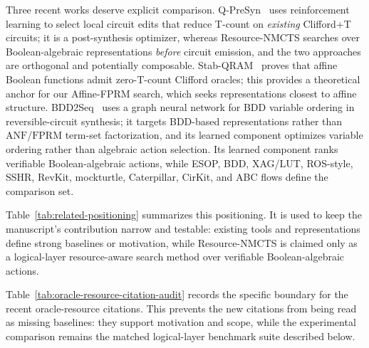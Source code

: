 \documentclass[11pt]{article}
\newcommand{\method}{Resource-NMCTS}
\newcommand{\anf}{\ensuremath{\mathrm{ANF}}}
\newcommand{\fprm}{\ensuremath{\mathrm{FPRM}}}
\newcommand{\mcts}{\ensuremath{\mathrm{MCTS}}}
\begin{document}
Three recent works deserve explicit comparison.  Q-PreSyn~\cite{qpresyn2026}
uses reinforcement learning to select local circuit edits that reduce T-count
on \emph{existing} Clifford+T circuits; it is a post-synthesis optimizer,
whereas \method{} searches over Boolean-algebraic representations
\emph{before} circuit emission, and the two approaches are orthogonal and
potentially composable.  Stab-QRAM~\cite{stabqram2025} proves that affine
Boolean functions admit zero-T-count Clifford oracles; this provides a
theoretical anchor for our Affine-FPRM search, which seeks representations
closest to affine structure.  BDD2Seq~\cite{bdd2seq2025} uses a graph neural
network for BDD variable ordering in reversible-circuit synthesis; it targets
BDD-based representations rather than \anf{}/\fprm{} term-set factorization,
and its learned component optimizes variable ordering rather than algebraic
action selection.  Its
learned component ranks verifiable Boolean-algebraic actions, while ESOP, BDD,
XAG/LUT, ROS-style, SSHR, RevKit, mockturtle, Caterpillar, CirKit, and ABC flows
define the comparison set.

Table~\ref{tab:related-positioning} summarizes this positioning.  It is used
to keep the manuscript's contribution narrow and testable: existing tools and
representations define strong baselines or motivation, while \method{} is
claimed only as a logical-layer resource-aware search method over verifiable
Boolean-algebraic actions.

\begin{table}[H]
\centering
\scriptsize
\setlength{\tabcolsep}{2pt}
\renewcommand{\arraystretch}{1.05}
\caption{Related-work positioning matrix.  The table states what each
literature family optimizes, which gap motivates the proposed search, and how
the manuscript uses that family in experiments or claim boundaries.}
\label{tab:related-positioning}

\end{table}

Table~\ref{tab:oracle-resource-citation-audit} records the specific boundary
for the recent oracle-resource citations.  This prevents the new citations
from being read as missing baselines: they support motivation and scope, while
the experimental comparison remains the matched logical-layer benchmark suite
described below.

\begin{table}[H]
\centering
\scriptsize
\setlength{\tabcolsep}{3pt}
\renewcommand{\arraystretch}{1.04}
\caption{Recent oracle-resource citation audit.  Each row records what the
adjacent paper verifies and why it is not treated as a direct experimental
baseline for neural \mcts{} \anf{}/\fprm{} term search.}
\label{tab:oracle-resource-citation-audit}

\end{table}
\end{document}
